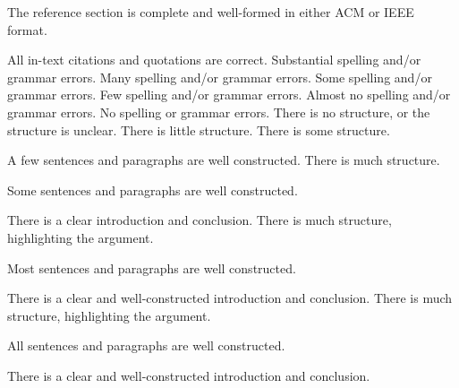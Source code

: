 \documentclass{../fal_assignment}
\begin{document}
\begin{markingrubric}
        \par 		The reference section is complete and well-formed in either ACM or IEEE format.
        \par 		All in-text citations and quotations are correct.
%
        \grade\fail 	Substantial spelling and/or grammar errors.
        \grade 		Many spelling and/or grammar errors.
        \grade 		Some spelling and/or grammar errors.  
        \grade 		Few spelling and/or grammar errors.
        \grade 		Almost no spelling and/or grammar errors.
        \grade 		No spelling or grammar errors.
%
        \grade\fail 	There is no structure, or the structure is unclear.
        \grade 		There is little structure.
        \grade 		There is some structure.
        \par 		A few sentences and paragraphs are well constructed.
        \grade 		There is much structure.
        \par 		Some sentences and paragraphs are well constructed.
        \par 		There is a clear introduction and conclusion.
        \grade 		There is much structure, highlighting the argument.
        \par 		Most sentences and paragraphs are well constructed.
        \par 		There is a clear and well-constructed introduction and conclusion.
        \grade 		There is much structure, highlighting the argument.
        \par 		All sentences and paragraphs are well constructed.
        \par 		There is a clear and well-constructed introduction and conclusion.
\end{markingrubric}
\end{document}
